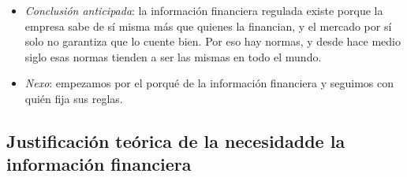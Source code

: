 \documentclass[11pt]{article}
\begin{document}
\begin{itemize}
\item \emph{Conclusión anticipada}: la información financiera regulada existe porque la empresa sabe de sí misma más que quienes la financian, y el mercado por sí solo no garantiza que lo cuente bien. Por eso hay normas, y desde hace medio siglo esas normas tienden a ser las mismas en todo el mundo.
\item \emph{Nexo}: empezamos por el porqué de la información financiera y seguimos con quién fija sus reglas.
\end{itemize}

\subsection{Justificación teórica de la necesidad\cortetitulo de la información financiera}\label{sec:justificacion}
\end{document}

